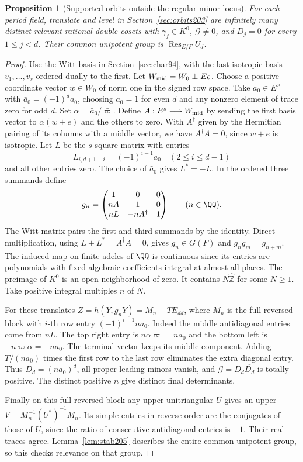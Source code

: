 \documentclass[a4paper,11pt]{article}
\newtheorem{proposition}{Proposition}[section]
\theoremstyle{definition}
\theoremstyle{remark}
\newcommand{\ZZ}{\mathbb Z}\newcommand{\ord}{\operatorname{ord}}
\numberwithin{equation}{section}
\begin{document}
\begin{proposition}[Supported orbits outside the regular minor locus]
\label{prop:oneblock205}
For each period field, translate and level in Section~\ref{sec:orbits203} are infinitely many distinct relevant rational double cosets
with \(\gamma_f\in K^0\), \(\mathcal G\ne0\), and \(D_j=0\)
for every \(1\le j<d\). Their common unipotent group is
\(\operatorname{Res}_{E/F} U_d\).
\end{proposition}
\begin{proof}
Use the Witt basis in Section~\ref{sec:char94}, with the last
isotropic basis \(v_1,\ldots,v_s\) ordered dually to the first.
Let \(W_{\rm mid}=W_0\perp Ee\). Choose a positive coordinate
vector \(w\in W_0\) of norm one in the signed row space. Take
\(a_0\in E^\times\) with \(\bar a_0=(-1)^d a_0\), choosing
\(a_0=1\) for even \(d\) and any nonzero element of trace zero
for odd \(d\). Set \(\alpha=\bar a_0/\bar\varpi\). Define
\(A:E^s\longrightarrow W_{\rm mid}\) by sending the first basis
vector to \(\alpha(w+e)\) and the others to zero. With \(A^\dagger\)
given by the Hermitian pairing of its columns with a middle vector,
we have \(A^\dagger A=0\), since \(w+e\) is isotropic.
Let \(L\) be the \(s\)-square matrix with entries
\[
       L_{i,d+1-i}=(-1)^{i-1}a_0\quad(2\le i\le d-1)
\]
and all other entries zero. The choice of \(\bar a_0\) gives
\(L^*=-L\). In the ordered three summands define
\[
   g_n=\begin{pmatrix}
     1 &0&0\\ n A&1&0\\ nL&-n A^\dagger&1
   \end{pmatrix}\qquad(n\in\QQ).
\]
The Witt matrix pairs the first and third summands by the identity.
Direct multiplication, using \(L+L^*=A^\dagger A=0\), gives
\(g_n\in G(F)\) and \(g_n g_m=g_{n+m}\).
The induced map on finite adeles of \(\QQ\) is continuous since its
entries are polynomials with fixed algebraic coefficients integral
at almost all places. The preimage of \(K^0\) is an open neighborhood
of zero. It contains \(N\widehat{\ZZ}\) for some \(N\ge1\).
Take positive integral multiples \(n\) of \(N\).

For these translates \(Z=h(Y,g_nY)=M_n-TE_{dd}\), where \(M_n\)
is the full reversed block with \(i\)-th row entry
\((-1)^{i-1}n a_0\). Indeed the middle antidiagonal entries come
from \(nL\). The top right entry is \(n\bar\alpha\varpi=na_0\)
and the bottom left is \(-n\bar\varpi\alpha=-n\bar a_0\).
The terminal vector keeps its middle component. Adding \(T/(na_0)\)
times the first row to the last row eliminates the extra diagonal
entry. Thus \(D_d=(na_0)^d\), all proper leading minors vanish,
and \(\mathcal G=D_d\overline{D_d}\) is totally positive.
The distinct positive \(n\) give distinct final determinants.

Finally on this full reversed block any upper unitriangular \(U\)
gives an upper \(V=M_n^{-1}(U^*)^{-1}M_n\). Its simple entries
in reverse order are the conjugates of those of \(U\), since the
ratio of consecutive antidiagonal entries is \(-1\). Their real
traces agree. Lemma~\ref{lem:stab205} describes the entire common
unipotent group, so this checks relevance on that group.
\end{proof}
\end{document}
